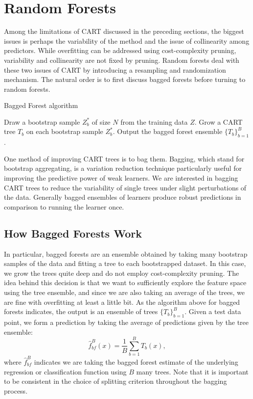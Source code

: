\documentclass[12pt,twoside]{reedthesis}
\theoremstyle{definition}
\theoremstyle{definition}
\theoremstyle{definition}
\theoremstyle{remark}
\begin{document}
\section{Random Forests}\label{random-forests}

Among the limitations of CART discussed in the preceding sections, the
biggest issues is perhaps the variability of the method and the issue of
collinearity among predictors. While overfitting can be addressed using
cost-complexity pruning, variability and collinearity are not fixed by
pruning. Random forests deal with these two issues of CART by
introducing a resampling and randomization mechanism. The natural order
is to first discuss bagged forests before turning to random forests.
\begin{algorithm}
        \caption{Bagged Forest algorithm}\label{bagged forest}
        \begin{algorithmic}[1]
            \State Draw a bootstrap sample $Z_b^*$ of size $N$ from the training data $Z$.
            \State Grow a CART tree $T_b$ on each bootstrap sample $Z_b^*$.
            \EndFor
            \State Output the bagged forest ensemble $\{T_b\}_{b=1}^B$.
        \end{algorithmic}
    \end{algorithm}
One method of improving CART trees is to bag them. Bagging, which stand
for bootstrap aggregating, is a variation reduction technique
particularly useful for improving the predictive power of weak learners.
We are interested in bagging CART trees to reduce the variability of
single trees under slight perturbations of the data. Generally bagged
ensembles of learners produce robust predictions in comparison to
running the learner once.

\subsection{How Bagged Forests Work}\label{how-bagged-forests-work}

In particular, bagged forests are an ensemble obtained by taking many
bootstrap samples of the data and fitting a tree to each bootstrapped
dataset. In this case, we grow the trees quite deep and do not employ
cost-complexity pruning. The idea behind this decision is that we want
to sufficiently explore the feature space using the tree ensemble, and
since we are also taking an average of the trees, we are fine with
overfitting at least a little bit. As the algorithm above for bagged
forests indicates, the output is an ensemble of trees
\(\{T_b\}_{b=1}^B\). Given a test data point, we form a prediction by
taking the average of predictions given by the tree ensemble:
\[\hat{f}_{bf}^B(x)=\frac{1}{B}\sum_{b=1}^B T_b(x),\] where
\(\hat{f}_{bf}^B\) indicates we are taking the bagged forest estimate of
the underlying regression or classification function using \(B\) many
trees. Note that it is important to be consistent in the choice of
splitting criterion throughout the bagging process.
\end{document}
